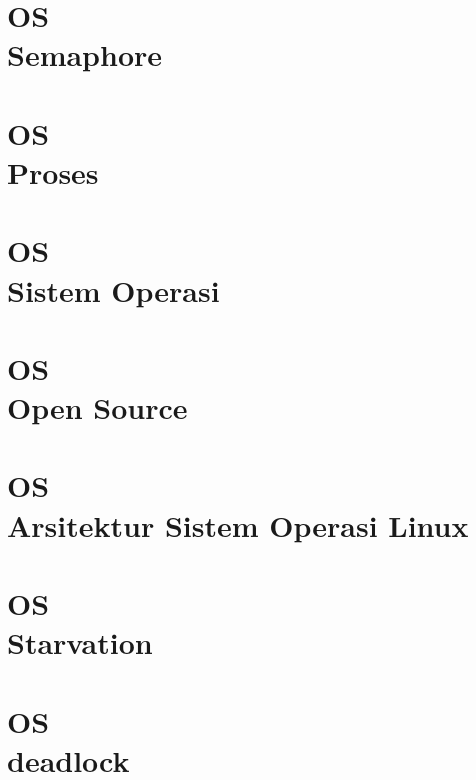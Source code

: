 \documentclass{wileySix}
\begin{document}
%

	
\chapter[OS Semaphore]
{OS\\ Semaphore}


\chapter[Proses OS]
{OS\\ Proses}


%

\chapter[Sistem Operasi]
{OS\\ Sistem Operasi}


\chapter[Open Sourcei]
{OS\\ Open Source}


\chapter[Linux]
{OS\\ Arsitektur Sistem Operasi Linux}


\chapter[Starvation]
{OS\\ Starvation}


\chapter[DeadLock]
{OS\\ deadlock}

\end{document}
